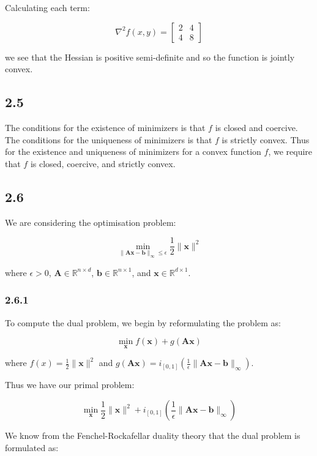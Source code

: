 \documentclass[12pt]{article}
\begin{document}
Calculating each term:

\[\nabla^2 f(x, y) = \begin{bmatrix}
                 2 & 4\\
                 4 & 8
         \end{bmatrix}
\]

we see that the Hessian is positive semi-definite and so the function is jointly convex.

\subsection*{2.5}
  The conditions for the existence of minimizers is that $f$ is closed and coercive.
  The conditions for the uniqueness of minimizers is that $f$ is strictly convex.
Thus for the existence and uniqueness of minimizers for a convex function $f$, we require that $f$ is closed, coercive, and strictly convex.

\subsection*{2.6}

We are considering the optimisation problem:

\[\min_{\|\textbf{A}\textbf{x} - \textbf{b}\|_{\infty} \leq \epsilon} \frac{1}{2}\|\textbf{x}\|^2\]

where $\epsilon > 0$, $\textbf{A} \in \mathbb{R}^{n\times d}$, $\textbf{b} \in \mathbb{R}^{n \times 1}$, and $\textbf{x} \in \mathbb{R}^{d \times 1}$.

\subsubsection*{2.6.1}

To compute the dual problem, we begin by reformulating the problem as:

\[\min_{\textbf{x}}  f(\textbf{x}) + g(\textbf{Ax})\]

where $f(x) = \frac{1}{2}\|\textbf{x}\|^2$ and $g(\textbf{Ax}) =  i_{[0, 1]}\left(\frac{1}{\epsilon}\|\textbf{A}\textbf{x} - \textbf{b}\|_{\infty}\right)$.

Thus we have our primal problem:

\[\min_{\textbf{x}}  \frac{1}{2}\|\textbf{x}\|^2 + i_{[0, 1]}\left(\frac{1}{\epsilon}\|\textbf{A}\textbf{x} - \textbf{b}\|_{\infty}\right)\]


We know from the Fenchel-Rockafellar duality theory that the dual problem is formulated as:
\end{document}
